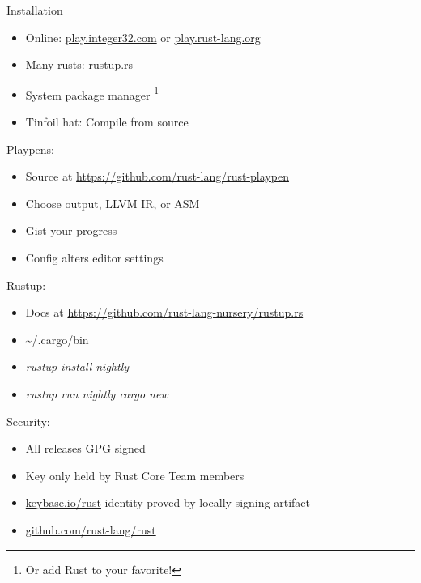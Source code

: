 \documentclass[50pt]{beamer}
\begin{document}
\begin{frame}
    Installation
    \begin{itemize}
        \item Online: \url{play.integer32.com} or \url{play.rust-lang.org}
        \item Many rusts: \url{rustup.rs}
        \item System package manager \footnote{Or add Rust to your favorite!}
        \item Tinfoil hat: Compile from source
    \end{itemize}
\end{frame}

\begin{frame}
    Playpens:
    \begin{itemize}
        \item Source at \url{https://github.com/rust-lang/rust-playpen}
        \item Choose output, LLVM IR, or ASM
        \item Gist your progress
        \item Config alters editor settings
    \end{itemize}
\end{frame}

\begin{frame}
    Rustup:
    \begin{itemize}
        \item Docs at \url{https://github.com/rust-lang-nursery/rustup.rs}
        \item \textasciitilde /.cargo/bin
        \item \textit{rustup install nightly}
        \item \textit{rustup run nightly cargo new}
    \end{itemize}
\end{frame}

\begin{frame}
    Security:
    \begin{itemize}
        \item All releases GPG signed
        \item Key only held by Rust Core Team members
        \item \url{keybase.io/rust} identity proved by locally signing artifact
        \item \url{github.com/rust-lang/rust}
    \end{itemize}
\end{frame}
\end{document}
